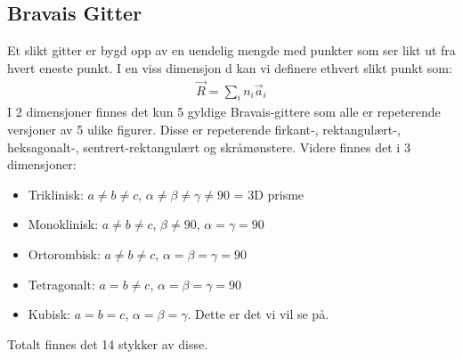 \documentclass{article}
\begin{document}
\subsection{Bravais Gitter}
Et slikt gitter er bygd opp av en uendelig mengde med punkter som ser likt ut fra hvert eneste punkt. I en viss dimensjon d kan vi definere ethvert slikt punkt som:
\begin{align*}
    \vec{R} = \sum_{i} n_i \vec{a}_i
\end{align*}
I 2 dimensjoner finnes det kun 5 gyldige Bravais-gittere som alle er repeterende versjoner av 5 ulike figurer. Disse er repeterende firkant-, rektangulært-, heksagonalt-, sentrert-rektangulært og skråmønstere. Videre finnes det i 3 dimensjoner:
\begin{itemize}
    \item Triklinisk: $a\ne b\ne c$, $\alpha \ne \beta \ne \gamma \ne 90$ = 3D prisme
    \item Monoklinisk: $a \ne b \ne c$, $\beta \ne 90$, $\alpha = \gamma = 90$
    \item Ortorombisk: $a \ne b \ne c$, $\alpha = \beta = \gamma = 90$
    \item Tetragonalt: $a = b \ne c$, $\alpha = \beta = \gamma = 90$
    \item Kubisk: $a = b = c$, $\alpha = \beta = \gamma$. Dette er det vi vil se på.
\end{itemize}
Totalt finnes det 14 stykker av disse.
\end{document}

